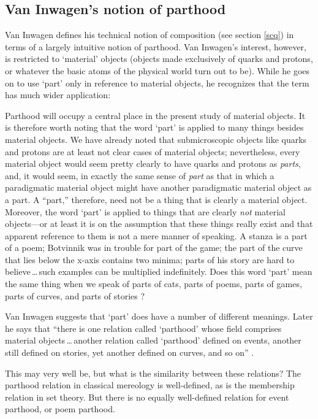 \documentclass[11pt]{article}
\newenvironment{squote}{%
\begin{spacing}{1}
\begin{list}{}{%
\setlength{\labelwidth}{0pt}%
\rightmargin\leftmargin%
}
\item\relax
}{%
\end{list}%
\end{spacing}
}
\begin{document}
\begin{spacing}{1.5}
\subsection{Van Inwagen's notion of parthood}
\label{van-part}
Van Inwagen defines his technical notion of composition (see section
\ref{scq}) in terms of a largely intuitive notion of parthood.  Van
Inwagen's interest, however, is restricted to `material' objects
(objects made exclusively of quarks and protons, or whatever the basic
atoms of the physical world turn out to be).  While he goes on to use
`part' only in reference to material objects, he recognizes that the
term has much wider application:

\begin{squote}
Parthood will occupy a central place in the present study of material
objects.  It is therefore worth noting that the word `part' is applied
to many things besides material objects.  We have already noted that
submicroscopic objects like quarks and protons are at least not clear
cases of material objects; nevertheless, every material object would
seem pretty clearly to have quarks and protons as \emph{parts}, and,
it would seem, in exactly the same sense of \emph{part} as that in
which a paradigmatic material object might have another paradigmatic
material object as a part.  A ``part,'' therefore, need not be a thing
that is clearly a material object.  Moreover, the word `part' is
applied to things that are clearly \emph{not} material objects---or at
least it is on the assumption that these things really exist and that
apparent reference to them is not a mere manner of speaking.  A stanza
is a part of a poem; Botvinnik was in trouble for part of the game;
the part of the curve that lies below the x-axis contains two minima;
parts of his story are hard to believe\,\ldots\,such examples can be
multiplied indefinitely.  Does this word `part' mean the same thing
when we speak of parts of cats, parts of poems, parts of games, parts
of curves, and parts of stories \citeyearpar[18--19]{inwagen1995}?
\end{squote} 

Van Inwagen suggests that `part' does have a number of different
meanings.  Later he says that ``there is one relation called
`parthood' whose field comprises material objects\,\ldots\,another
relation called `parthood' defined on events, another still defined on
stories, yet another defined on curves, and so on''
\citeyearpar[19]{inwagen1995}.

This may very well be, but what is the similarity between these
relations?  The parthood relation in classical mereology is
well-defined, as is the membership relation in set theory.  But there
is no equally well-defined relation for event parthood, or poem parthood.


\end{spacing}
\end{document}
